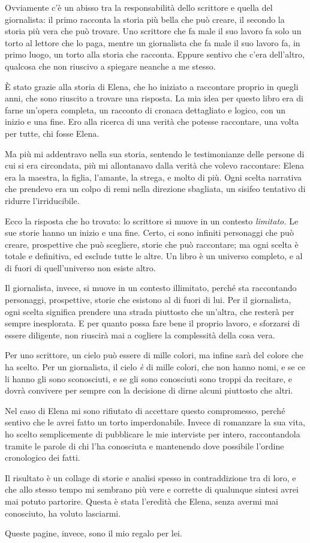 \documentclass[12pt]{book}
\begin{document}
Ovviamente c'è un abisso tra la responsabilità dello scrittore e quella del giornalista: il primo racconta la storia più bella che può creare, il secondo la storia più vera che può trovare. Uno scrittore che fa male il suo lavoro fa solo un torto al lettore che lo paga, mentre un giornalista che fa male il suo lavoro fa, in primo luogo, un torto alla storia che racconta. Eppure sentivo che c'era dell'altro, qualcosa che non riuscivo a spiegare neanche a me stesso.

È stato grazie alla storia di Elena, che ho iniziato a raccontare proprio in quegli anni, che sono riuscito a trovare una risposta. La mia idea per questo libro era di farne un'opera completa, un racconto di cronaca dettagliato e logico, con un inizio e una fine. Ero alla ricerca di una verità che potesse raccontare, una volta per tutte, chi fosse Elena.

Ma più mi addentravo nella sua storia, sentendo le testimonianze delle persone di cui si era circondata, più mi allontanavo dalla verità che volevo raccontare: Elena era la maestra, la figlia, l'amante, la strega, e molto di più. Ogni scelta narrativa che prendevo era un colpo di remi nella direzione sbagliata, un sisifeo tentativo di ridurre l'irriducibile.

Ecco la risposta che ho trovato: lo scrittore si muove in un contesto \emph{limitato.} Le sue storie hanno un inizio e una fine. Certo, ci sono infiniti personaggi che può creare, prospettive che può scegliere, storie che può raccontare; ma ogni scelta è totale e definitiva, ed esclude tutte le altre. Un libro è un universo completo, e al di fuori di quell'universo non esiste altro.

Il giornalista, invece, si muove in un contesto illimitato, perché sta raccontando personaggi, prospettive, storie che esistono al di fuori di lui. Per il giornalista, ogni scelta significa prendere una strada piuttosto che un'altra, che resterà per sempre inesplorata. E per quanto possa fare bene il proprio lavoro, e sforzarsi di essere diligente, non riuscirà mai a cogliere la complessità della cosa vera.

Per uno scrittore, un cielo può essere di mille colori, ma infine sarà del colore che ha scelto. Per un giornalista, il cielo \emph{è} di mille colori, che non hanno nomi, e se ce li hanno gli sono sconosciuti, e se gli sono conosciuti sono troppi da recitare, e dovrà convivere per sempre con la decisione di dirne alcuni piuttosto che altri.

Nel caso di Elena mi sono rifiutato di accettare questo compromesso, perché sentivo che le avrei fatto un torto imperdonabile. Invece di romanzare la sua vita, ho scelto semplicemente di pubblicare le mie interviste per intero, raccontandola tramite le parole di chi l'ha conosciuta e mantenendo dove possibile l'ordine cronologico dei fatti.

Il risultato è un collage di storie e analisi spesso in contraddizione tra di loro, e che allo stesso tempo mi sembrano più vere e corrette di qualunque sintesi avrei mai potuto partorire. Questa è stata l'eredità che Elena, senza avermi mai conosciuto, ha voluto lasciarmi.

Queste pagine, invece, sono il mio regalo per lei.

\cleardoublepage
\end{document}
